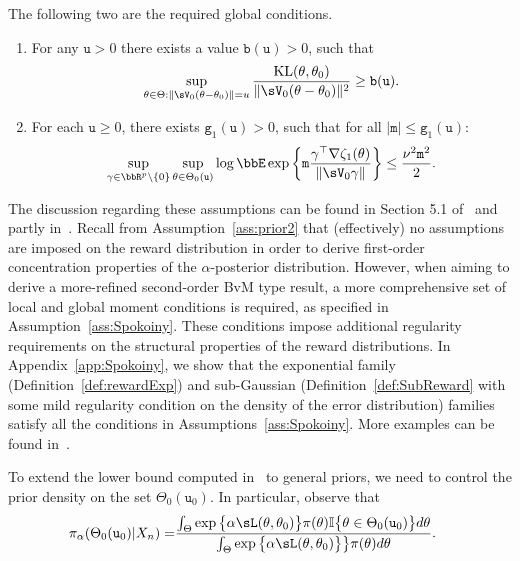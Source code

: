 \documentclass[11pt]{article}
\newcommand{\Ind}{\mathbb{I}}
\begin{document}
 
  The following two are the required global conditions.
  \begin{enumerate}
    \item[\( {(\ell{\mathtt{u}})} \)]
      For any \(\mathtt{u}>0\) there exists a value \(\mathtt{b}(\mathtt{u}) > 0\),
      such that  
      \begin{align}
            \sup_{\theta \in \Theta: \|\sV_0(\theta - \theta_0)\|= u} \frac{\text{KL}(\theta,\theta_0)}{\|\sV_0 (\theta - \theta_0)\|^2} \ge \mathtt{b}(\mathtt{u}).
      \end{align}

      \item[\( {(e\mathtt{u})} \)]
       For each $\mathtt{u} \geq 0$, there exists $\mathtt{g}_1(\mathtt{u}) >0 $, such that for all $|\mathtt{m}| \le \mathtt{g}_1(\mathtt{u})$:
      \begin{align}
        \sup_{\gamma \in \bbR^{p}\setminus \{0\}} \sup_{\theta \in \Theta_0(\mathtt{u})} \log \bbE \exp\left\{
        \mathtt{m} \frac{ \gamma^{\top}\nabla \zeta_1(\theta)   }{ \|\sV_0 \gamma\|}
        \right\}
        \le
        \frac{\nu^{2} \mathtt{m}^{2}}{2}.
      \end{align}
  \end{enumerate}

The discussion regarding these assumptions can be found in Section 5.1 of~\cite{Spokoiny2012} and partly in~\cite{Panov2015}. Recall from Assumption~\ref{ass:prior2} that (effectively) no assumptions are imposed on the reward distribution in order to derive first-order concentration properties of the $\alpha$-posterior distribution. 
 However, when aiming to derive a more-refined second-order BvM type result, a more comprehensive set of local and global moment conditions is required, as specified in Assumption~\ref{ass:Spokoiny}. These conditions impose additional regularity requirements on the structural properties of the reward distributions. In Appendix~\ref{app:Spokoiny}, we show that the exponential family (Definition~\ref{def:rewardExp}) and sub-Gaussian  (Definition~\ref{def:SubReward} with some mild regularity condition on the density of the error distribution) families satisfy all the conditions in Assumptions~\ref{ass:Spokoiny}. More examples can be found in~\cite{Spokoiny2012,Panov2015}.
 
 To extend the lower bound computed in~\cite[Theorem 4]{Panov2015} to general priors, we need to control the prior density on the set $\Theta_0(\mathtt{u}_0)$. In particular, observe that
  \begin{align}
    \pi_{\alpha}(\Theta_0(\mathtt{u}_0)|X_n)  
    =&
    \frac{\int_{\Theta} \exp \big\{ {\alpha} \sL(\theta, \theta_0) \big\} \pi(\theta)
            \Ind\big\{\theta \in \Theta_0(\mathtt{u}_0)\big\} d \theta}
         {\int_{\Theta} \exp \big\{ {\alpha} \sL(\theta, \theta_0) \big\}
            \big\} \pi (\theta) d \theta}.
  \label{eq:concentrBvmTarget}
  \end{align}
\end{document}
